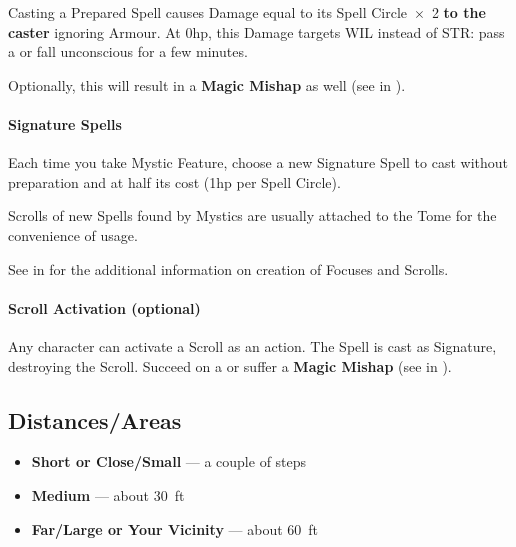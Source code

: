 \documentclass[itdr]{subfiles}
\begin{document}
Casting a Prepared Spell causes Damage equal to its Spell Circle~$\times$~2 \textbf{to the caster} ignoring Armour. At 0hp, this Damage targets WIL instead of STR: pass a  or fall unconscious for a few minutes.
\begin{dbox}
Optionally, this will result in a \textbf{Magic Mishap} as well (see \textbf{} in \textbf{}).
\end{dbox}

\vfill

\paragraph{Signature Spells}
Each time you take Mystic Feature, choose a new Signature Spell to cast without preparation and at half its cost (1hp per Spell Circle).

\vfill
\break

\begin{dbox}
	Scrolls of new Spells found by Mystics are usually attached to the Tome for the convenience of usage.
	
	See \textbf{} in \mbox{\textbf{}} for the additional information on creation of Focuses and Scrolls.
\end{dbox}

\vfill
{}

\begin{dbox}
	\paragraph{Scroll Activation (optional)}
	Any character can activate a Scroll as an action. The Spell is cast as Signature, destroying the Scroll. Succeed on a  or suffer a \textbf{Magic Mishap} (see \textbf{} in \textbf{}).
\end{dbox}

\break

\begin{dbox}
	\subsection*{Distances/Areas}
	\begin{itemize}
		\item \textbf{Short or Close/Small} --- a couple of steps
		\item \textbf{Medium} --- about 30~ft
		\item \textbf{Far/Large or Your Vicinity} --- about 60~ft
	\end{itemize}
\end{dbox}
\end{document}
